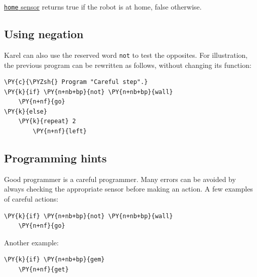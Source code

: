 \underline{{\tt home} sensor} returns true if the robot is at home, false otherwise.

\subsection{Using negation}

Karel can also use the reserved word {\tt not} to test the opposites.
For illustration, the previous program can be rewritten as follows, without 
changing its function:\\

\begin{bbox}
\begin{Verbatim}[commandchars=\\\{\}]
\PY{c}{\PYZsh{} Program "Careful step".}
\PY{k}{if} \PY{n+nb+bp}{not} \PY{n+nb+bp}{wall}
    \PY{n+nf}{go}
\PY{k}{else}
    \PY{k}{repeat} 2
        \PY{n+nf}{left}
\end{Verbatim}
\end{bbox}
\vspace{6mm}

\noindent

\subsection{Programming hints}

Good programmer is a careful programmer. Many errors can be avoided by always checking the 
appropriate sensor before making an action. A few examples of careful actions:\\
 
\begin{bbox}
\begin{Verbatim}[commandchars=\\\{\}]
\PY{k}{if} \PY{n+nb+bp}{not} \PY{n+nb+bp}{wall}
    \PY{n+nf}{go}
\end{Verbatim}
\end{bbox}
\vspace{6mm}

\noindent
Another example:\\
 
\begin{bbox}
\begin{Verbatim}[commandchars=\\\{\}]
\PY{k}{if} \PY{n+nb+bp}{gem}
    \PY{n+nf}{get}
\end{Verbatim}
\end{bbox}
\vspace{6mm}

